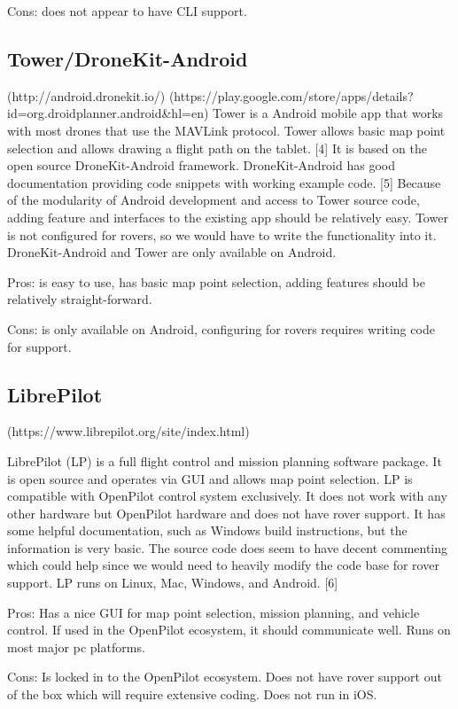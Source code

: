 \documentclass[compsoc,draftclsnofoot,onecolumn,10pt]{IEEEtran}
\begin{document}
Cons: does not appear to have CLI support.

\subsection{Tower/DroneKit-Android}(http://android.dronekit.io/) (https://play.google.com/store/apps/details?id=org.droidplanner.android\&hl=en)
Tower is a Android mobile app that works with most drones that use the MAVLink
protocol. Tower allows basic map point selection and allows drawing a flight
path on the tablet. [4] It is based on the open source DroneKit-Android framework.
DroneKit-Android has good documentation providing code snippets with working
example code. [5] Because of the modularity of Android development and access to
Tower source code, adding feature and interfaces to the existing app should be
relatively easy. Tower is not configured for rovers, so we would have to write
the functionality into it. DroneKit-Android and Tower are only available on Android. 

Pros: is easy to use, has basic map point selection, adding features should be
relatively straight-forward.

Cons: is only available on Android, configuring for rovers requires writing code
for support.

\subsection{LibrePilot}
(https://www.librepilot.org/site/index.html)  

LibrePilot (LP) is a full flight control and mission planning software
package. It is open source and operates via GUI and allows map point selection.
LP is compatible with OpenPilot control system exclusively. It does not
work with any other hardware but OpenPilot hardware and does not have rover
support. It has some helpful documentation, such as Windows build instructions,
but the information is very basic. The source code does seem to have decent
commenting which could help since we would need to heavily modify the code base
for rover support. LP runs on Linux, Mac, Windows, and Android. [6]

Pros: Has a nice GUI for map point selection, mission planning, and vehicle
control. If used in the OpenPilot ecosystem, it should communicate well. Runs
on most major pc platforms.

Cons: Is locked in to the OpenPilot ecosystem. Does not have rover support out
of the box which will require extensive coding. Does not run in iOS.
\end{document}
